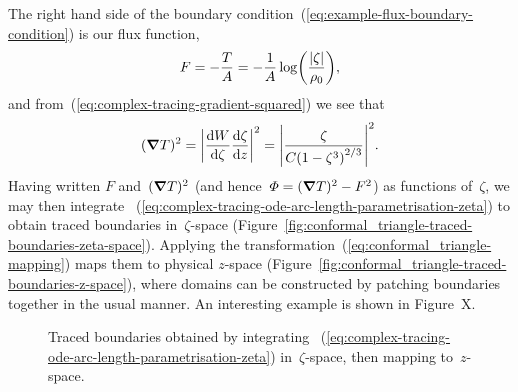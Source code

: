 The right hand side
of the boundary condition~(\ref{eq:example-flux-boundary-condition})
is our flux function,
\begin{equation}
  F = -\frac{T}{A} = -\frac{1}{A} \log \roundbr*{\frac{\abs{\zeta}}{\rho_0}},
  \label{eq:conformal_triangle-flux-function}
\end{equation}
and from~(\ref{eq:complex-tracing-gradient-squared})
we see that
\begin{equation}
  (\del T)^2
    = \abs*{\tder{W}{\zeta} \tder{\zeta}{z}}^2
    = \abs*{\frac{\zeta}{C \roundbr*{1 - \zeta^3}^{2/3}}}^2.
  \label{eq:conformal_triangle-gradient-squared}
\end{equation}
Having written $F$ and~$(\mathop{}\!\boldsymbol{\mathbf{\nabla}} T)^2$
(and hence~$\varPhi = (\mathop{}\!\boldsymbol{\mathbf{\nabla}} T)^2 - F^2$)
as functions of~$\zeta$,
we may then integrate~%
  (\ref{eq:complex-tracing-ode-arc-length-parametrisation-zeta})
to obtain traced boundaries in~$\zeta$-space
(Figure~\ref{fig:conformal_triangle-traced-boundaries-zeta-space}).
Applying the transformation~(\ref{eq:conformal_triangle-mapping})
maps them to physical $z$-space
(Figure~\ref{fig:conformal_triangle-traced-boundaries-z-space}),
where domains can be constructed
by patching boundaries together in the usual manner.
An interesting example is shown in Figure~X\@. %

\begin{figure}
  \newcommand*{\subfigurewidth}{0.47\textwidth}
  \begin{subfigure}[t]{\subfigurewidth}
  \end{subfigure}
    \hfill
  \begin{subfigure}[t]{\subfigurewidth}
  \end{subfigure}
  \caption{
    Traced boundaries obtained by integrating~%
      (\ref{eq:complex-tracing-ode-arc-length-parametrisation-zeta})
    in~$\zeta$-space,
    then mapping to~$z$-space.
  }
  \label{fig:conformal_triangle-traced-boundaries}
\end{figure}
